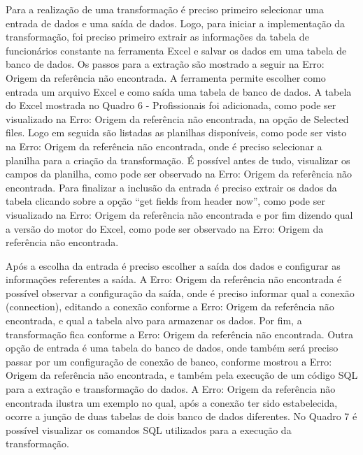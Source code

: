 Para a realização de uma transformação é preciso primeiro selecionar uma entrada de dados e uma saída de dados. Logo, para iniciar a implementação da transformação, foi preciso primeiro extrair as informações da tabela de funcionários constante na ferramenta Excel e salvar os dados em uma tabela de banco de dados. Os passos para a extração são mostrado a seguir na Erro: Origem da referência não encontrada.
A ferramenta permite escolher como entrada um arquivo Excel e como saída uma tabela de banco de dados. A tabela do Excel mostrada no Quadro 6 - Profissionais foi adicionada, como pode ser visualizado na Erro: Origem da referência não encontrada, na opção de Selected files. Logo em seguida são listadas as planilhas disponíveis, como pode ser visto na Erro: Origem da referência não encontrada, onde é preciso selecionar a planilha para a criação da transformação. É possível antes de tudo, visualizar os campos da planilha, como pode ser observado na Erro: Origem da referência não encontrada.
Para finalizar a inclusão da entrada é preciso extrair os dados da tabela clicando sobre a opção “get fields from header now”, como pode ser visualizado na Erro: Origem da referência não encontrada e por fim dizendo qual a versão do motor do Excel, como pode ser observado na Erro: Origem da referência não encontrada.

Após a escolha da entrada é preciso escolher a saída dos dados e configurar as informações referentes a saída.
A Erro: Origem da referência não encontrada é possível observar a configuração da saída, onde é preciso informar qual a conexão (connection), editando a conexão conforme a Erro: Origem da referência não encontrada, e qual a tabela alvo para armazenar os dados.
Por fim, a transformação fica conforme a Erro: Origem da referência não encontrada.
Outra opção de entrada é uma tabela do banco de dados, onde também será preciso passar por um configuração de conexão de banco, conforme mostrou a Erro: Origem da referência não encontrada, e também pela execução de um código SQL para a extração e transformação do dados. A Erro: Origem da referência não encontrada ilustra um exemplo no qual, após a conexão ter sido estabelecida, ocorre a junção de duas tabelas de dois banco de dados diferentes. No Quadro 7 é possível visualizar os comandos SQL utilizados para a execução da transformação.


